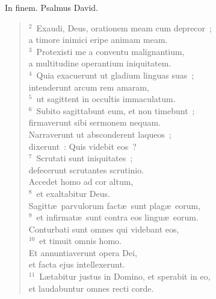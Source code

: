\lettrine[lines=3,image=true,loversize=0.05,lraise=-0.03]{I}{}n finem. Psalmus David.
\begin{flushleft}\begin{verse}\vspace{6pt}${}^{2}$~Exaudi, Deus, orationem meam cum deprecor~;\\ a timore inimici eripe animam meam.\\
${}^{3}$~Protexisti me a conventu malignantium,\\ a multitudine operantium iniquitatem.\\
${}^{4}$~Quia exacuerunt ut gladium linguas suas~;\\ intenderunt arcum rem amaram,\\
${}^{5}$~ut sagittent in occultis immaculatum.\\
${}^{6}$~Subito sagittabunt eum, et non timebunt~;\\ firmaverunt sibi sermonem nequam.\\ Narraverunt ut absconderent laqueos~;\\ dixerunt~: Quis videbit eos~?\\
${}^{7}$~Scrutati sunt iniquitates~;\\ defecerunt scrutantes scrutinio.\\ Accedet homo ad cor altum,\\
${}^{8}$~et exaltabitur Deus.\\ Sagitt\ae\ parvulorum fact\ae\ sunt plag\ae\ eorum,\\
${}^{9}$~et infirmat\ae\ sunt contra eos lingu\ae\ eorum.\\ Conturbati sunt omnes qui videbant eos,\\
${}^{10}$~et timuit omnis homo.\\ Et annuntiaverunt opera Dei,\\ et facta ejus intellexerunt.\\
${}^{11}$~L\ae tabitur justus in Domino, et sperabit in eo,\\ et laudabuntur omnes recti corde.\end{verse}\end{flushleft}



